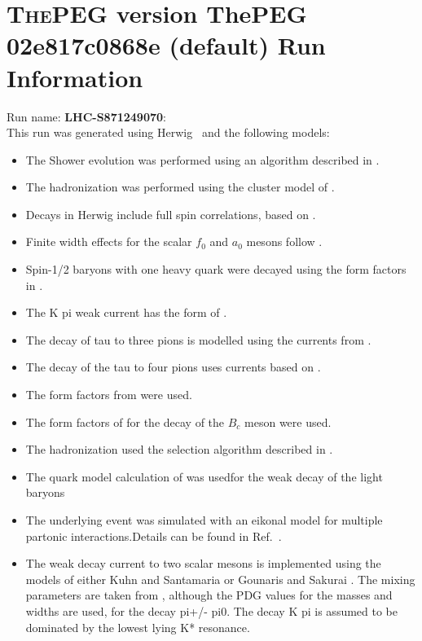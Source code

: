 \documentclass{article}
\begin{document}
\appendix
\section[xxx]{\textsc{ThePEG} version ThePEG 02e817c0868e (default) \cite{ThePEG} Run Information}
Run name: \textbf{LHC-S871249070}:\\
This run was generated using Herwig~\cite{Bahr:2008pv} and the following models:
\begin{itemize}
\item The Shower evolution was performed using an algorithm described in \cite{Marchesini:1983bm,Marchesini:1987cf,Gieseke:2003rz,Bahr:2008pv}.
\item The hadronization was performed using the cluster model of \cite{Webber:1983if}.
\item Decays in Herwig include full spin correlations, based on \cite{Richardson:2001df}.
\item Finite width effects for the scalar $f_0$ and $a_0$ mesons follow \cite{Flatte:1976xu}.
\item Spin-1/2 baryons with one heavy quark were decayed using the form factors in \cite{Singleton:1990ye}.
\item The K pi weak current has the form of \cite{Finkemeier:1996dh}.
\item The decay of tau to three pions is modelled using the currents from \cite{Asner:1999kj}.
\item The decay of the tau to four pions uses currents based on \cite{Bondar:2002mw}.
\item The form factors from \cite{Ivanov:1996fj} were used.
\item The form factors of \cite{Kiselev:2002vz} for the decay of the $B_c$ meson were used.
\item The hadronization used the selection algorithm described in \cite{Kupco:1998fx}.
\item The quark model calculation of \cite{Schlumpf:1994fb} was usedfor the weak decay of the light baryons
\item The underlying event was simulated with an eikonal model for multiple partonic interactions.Details can be found in Ref.~\cite{Bahr:2008dy,Bahr:2009ek}.
\item The weak decay current to two scalar mesons is implemented using the models of either Kuhn and Santamaria \cite{Kuhn:1990ad} or Gounaris and Sakurai \cite{Gounaris:1968mw}. The mixing parameters are taken from \cite{Asner:1999kj}, although the PDG values for the masses and widths are used, for the decay pi+/- pi0. The decay K pi is assumed to  be dominated by the lowest lying K* resonance.

\end{itemize}
\end{document}
